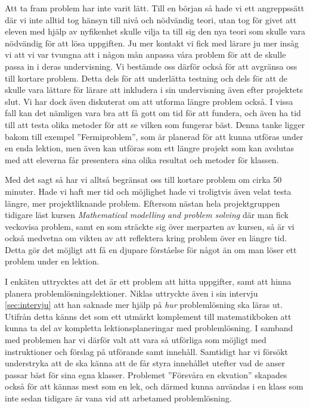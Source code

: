 \textcolor{Mahogany}{Att ta fram problem har inte varit lätt. Till en början så hade vi ett angreppssätt där vi inte alltid tog hänsyn till nivå och nödvändig teori, utan tog för givet att eleven med hjälp av nyfikenhet skulle vilja ta till sig den nya teori som skulle vara nödvändig för att lösa uppgiften. 
Ju mer kontakt vi fick med lärare ju mer insåg vi att vi var tvungna att i någon mån anpassa våra problem för att de skulle passa in i deras undervisning. Vi bestämde oss därför också för att avgränsa oss till kortare problem. Detta dels för att underlätta testning och dels för att de skulle vara lättare för lärare att inkludera i sin undervisning även efter projektets slut. Vi har dock även diskuterat om att utforma längre problem också. I vissa fall kan det nämligen vara bra att få gott om tid för att fundera, och även ha tid till att testa olika metoder för att se vilken som fungerar bäst. Denna tanke ligger bakom till exempel ''Fermiproblem'', som är planerad för att kunna utföras under en enda lektion, men även kan utföras som ett längre projekt som kan avslutas med att eleverna får presentera sina olika resultat och metoder för klassen.}

\textcolor{Mahogany}{Med det sagt så har vi alltså begränsat oss till kortare problem om cirka 50 minuter. Hade vi haft mer tid och möjlighet hade vi troligtvis även velat testa längre, mer projektliknande problem. Eftersom nästan hela projektgruppen tidigare läst kursen \textsl{Mathematical modelling and problem solving}\cite{matmod} där man fick veckovisa problem, samt en som sträckte sig över merparten av kursen, så är vi också medvetna om vikten av att reflektera kring problem över en längre tid. Detta gör det möjligt att få en djupare förståelse för något än om man löser ett problem under en lektion.}

\textcolor{lila}{
I enkäten uttrycktes att det är ett problem att hitta uppgifter, samt att hinna planera problemlösningslektioner. Niklas uttryckte även i sin intervju \ref{sec:intervju} att han saknade mer hjälp på \textsl{hur} problemlösning ska läras ut. }
\textcolor{Mahogany}{Utifrån detta känns det som ett utmärkt komplement till matematikboken att kunna ta del av kompletta lektionsplaneringar med problemlösning. I samband med problemen har vi därför valt att vara så utförliga som möjligt med instruktioner och förslag på utförande samt innehåll. Samtidigt har vi försökt understryka att de ska känna att de får styra innehållet utefter vad de anser passar bäst för sina egna klasser.}
\textcolor{lila}{Problemet ''Försvåra en ekvation'' skapades också för att kännas mest som en lek, och därmed kunna användas i en klass som inte sedan tidigare är vana vid att arbetamed problemlösning.}


